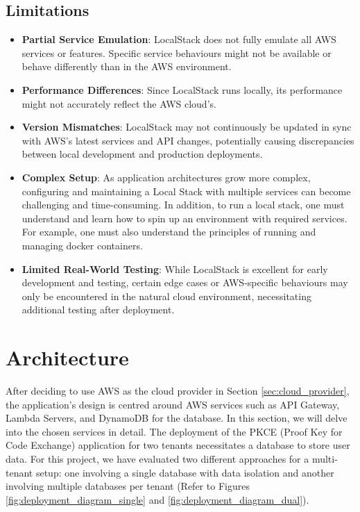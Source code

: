 \subsection{Limitations}
\begin{itemize}
    \item \textbf{Partial Service Emulation}: 
    LocalStack does not fully emulate all AWS services or features. Specific service behaviours might not be available or behave differently than in the AWS environment.
    
    \item \textbf{Performance Differences}: 
    Since LocalStack runs locally, its performance might not accurately reflect the AWS cloud's.
    
    
    \item \textbf{Version Mismatches}: 
    LocalStack may not continuously be updated in sync with AWS's latest services and API changes, potentially causing discrepancies between local development and production deployments.
    
    \item \textbf{Complex Setup}: 
    As application architectures grow more complex, configuring and maintaining a Local Stack with multiple services can become challenging and time-consuming. In addition, to run a local stack, one must understand and learn how to spin up an environment with required services. For example, one must also understand the principles of running and managing docker containers.
    
    \item \textbf{Limited Real-World Testing}: 
    While LocalStack is excellent for early development and testing, certain edge cases or AWS-specific behaviours may only be encountered in the natural cloud environment, necessitating additional testing after deployment.
    
\end{itemize}

\section{Architecture}
After deciding to use AWS as the cloud provider in Section \ref{sec:cloud_provider}, the application's design is centred around AWS services such as API Gateway, Lambda Servers, and DynamoDB for the database. In this section, we will delve into the chosen services in detail. The deployment of the PKCE (Proof Key for Code Exchange) application for two tenants necessitates a database to store user data. For this project, we have evaluated two different approaches for a multi-tenant setup: one involving a single database with data isolation and another involving multiple databases per tenant (Refer to Figures \ref{fig:deployment_diagram_single} and \ref{fig:deployment_diagram_dual}).



